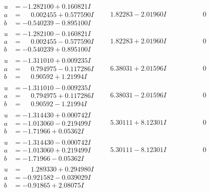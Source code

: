 \documentclass[1p]{elsarticle_modified}
\theoremstyle{definition}
\begin{document}
$$\begin{array}{c|c|c}
\begin{aligned}
u &= -1.282100 + 0.160821 I \\
a &= \phantom{-}0.002455 + 0.577590 I \\
b &= -0.540239 - 0.895100 I\end{aligned}
 & \phantom{-}1.82283 - 2.01960 I & \phantom{-0.000000 } 0 \\ \hline\begin{aligned}
u &= -1.282100 - 0.160821 I \\
a &= \phantom{-}0.002455 - 0.577590 I \\
b &= -0.540239 + 0.895100 I\end{aligned}
 & \phantom{-}1.82283 + 2.01960 I & \phantom{-0.000000 } 0 \\ \hline\begin{aligned}
u &= -1.311010 + 0.009235 I \\
a &= \phantom{-}0.794975 - 0.117286 I \\
b &= \phantom{-}0.90592 + 1.21994 I\end{aligned}
 & \phantom{-}6.38031 + 2.01596 I & \phantom{-0.000000 } 0 \\ \hline\begin{aligned}
u &= -1.311010 - 0.009235 I \\
a &= \phantom{-}0.794975 + 0.117286 I \\
b &= \phantom{-}0.90592 - 1.21994 I\end{aligned}
 & \phantom{-}6.38031 - 2.01596 I & \phantom{-0.000000 } 0 \\ \hline\begin{aligned}
u &= -1.314430 + 0.000742 I \\
a &= -1.013060 - 0.219499 I \\
b &= -1.71966 + 0.05362 I\end{aligned}
 & \phantom{-}5.30111 + 8.12301 I & \phantom{-0.000000 } 0 \\ \hline\begin{aligned}
u &= -1.314430 - 0.000742 I \\
a &= -1.013060 + 0.219499 I \\
b &= -1.71966 - 0.05362 I\end{aligned}
 & \phantom{-}5.30111 - 8.12301 I & \phantom{-0.000000 } 0 \\ \hline\begin{aligned}
u &= \phantom{-}1.289330 + 0.294980 I \\
a &= -0.921582 - 0.039029 I \\
b &= -0.91865 + 2.08075 I\end{aligned}

\end{array}$$
\end{document}

